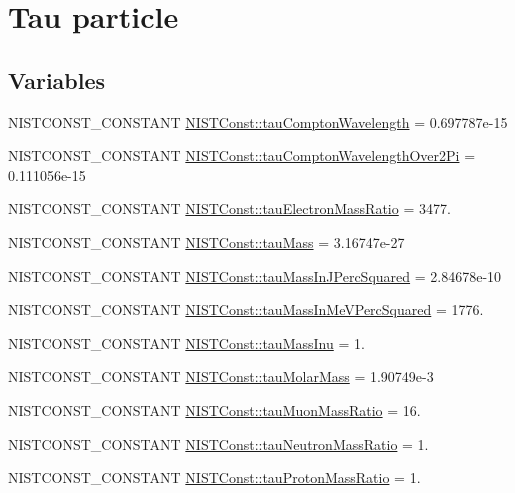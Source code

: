 \hypertarget{group___n_i_s_t_const-_tau}{}\section{Tau particle}
\label{group___n_i_s_t_const-_tau}
\subsection*{Variables}
\begin{DoxyCompactItemize}
\item 
N\+I\+S\+T\+C\+O\+N\+S\+T\+\_\+\+C\+O\+N\+S\+T\+A\+NT \mbox{\hyperlink{group___n_i_s_t_const-_tau_ga1e7146f26e4cb920f72024f7f00a2ffc}{N\+I\+S\+T\+Const\+::tau\+Compton\+Wavelength}} = 0.\+697787e-\/15
\item 
N\+I\+S\+T\+C\+O\+N\+S\+T\+\_\+\+C\+O\+N\+S\+T\+A\+NT \mbox{\hyperlink{group___n_i_s_t_const-_tau_gafb5d3f6d049829c8d9c6108395bb8941}{N\+I\+S\+T\+Const\+::tau\+Compton\+Wavelength\+Over2\+Pi}} = 0.\+111056e-\/15
\item 
N\+I\+S\+T\+C\+O\+N\+S\+T\+\_\+\+C\+O\+N\+S\+T\+A\+NT \mbox{\hyperlink{group___n_i_s_t_const-_tau_ga423a63e6cdf5cd53431196d8fdce69b3}{N\+I\+S\+T\+Const\+::tau\+Electron\+Mass\+Ratio}} = 3477.
\item 
N\+I\+S\+T\+C\+O\+N\+S\+T\+\_\+\+C\+O\+N\+S\+T\+A\+NT \mbox{\hyperlink{group___n_i_s_t_const-_tau_ga6446f567d081069cd3445c5291486891}{N\+I\+S\+T\+Const\+::tau\+Mass}} = 3.\+16747e-\/27
\item 
N\+I\+S\+T\+C\+O\+N\+S\+T\+\_\+\+C\+O\+N\+S\+T\+A\+NT \mbox{\hyperlink{group___n_i_s_t_const-_tau_gaae3cf44ced1b552b08c8d7f20eb4e841}{N\+I\+S\+T\+Const\+::tau\+Mass\+In\+J\+Perc\+Squared}} = 2.\+84678e-\/10
\item 
N\+I\+S\+T\+C\+O\+N\+S\+T\+\_\+\+C\+O\+N\+S\+T\+A\+NT \mbox{\hyperlink{group___n_i_s_t_const-_tau_gab59c5d5dfd5beccbc0d1c4e15c2f2419}{N\+I\+S\+T\+Const\+::tau\+Mass\+In\+Me\+V\+Perc\+Squared}} = 1776.
\item 
N\+I\+S\+T\+C\+O\+N\+S\+T\+\_\+\+C\+O\+N\+S\+T\+A\+NT \mbox{\hyperlink{group___n_i_s_t_const-_tau_ga60f1dee44e5eb1d5d93283cb16492d66}{N\+I\+S\+T\+Const\+::tau\+Mass\+Inu}} = 1.
\item 
N\+I\+S\+T\+C\+O\+N\+S\+T\+\_\+\+C\+O\+N\+S\+T\+A\+NT \mbox{\hyperlink{group___n_i_s_t_const-_tau_gae6d837c9fb04a8023c11b38729d625cd}{N\+I\+S\+T\+Const\+::tau\+Molar\+Mass}} = 1.\+90749e-\/3
\item 
N\+I\+S\+T\+C\+O\+N\+S\+T\+\_\+\+C\+O\+N\+S\+T\+A\+NT \mbox{\hyperlink{group___n_i_s_t_const-_tau_ga126931b63abcfebd3e0d69e383681537}{N\+I\+S\+T\+Const\+::tau\+Muon\+Mass\+Ratio}} = 16.
\item 
N\+I\+S\+T\+C\+O\+N\+S\+T\+\_\+\+C\+O\+N\+S\+T\+A\+NT \mbox{\hyperlink{group___n_i_s_t_const-_tau_gab3e3d1b44d1154e48473258e66776a98}{N\+I\+S\+T\+Const\+::tau\+Neutron\+Mass\+Ratio}} = 1.
\item 
N\+I\+S\+T\+C\+O\+N\+S\+T\+\_\+\+C\+O\+N\+S\+T\+A\+NT \mbox{\hyperlink{group___n_i_s_t_const-_tau_ga84073289618aea5e4cd9508f7d264273}{N\+I\+S\+T\+Const\+::tau\+Proton\+Mass\+Ratio}} = 1.
\end{DoxyCompactItemize}


